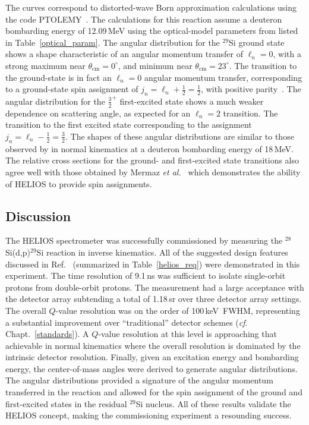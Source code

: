 The curves correspond to distorted-wave Born approximation calculations using the code PTOLEMY~\cite{Macfarlane_1978}.  The calculations for this reaction assume a deuteron bombarding energy of 12.09\,MeV using the optical-model parameters from listed in Table~\ref{optical_param}.  The angular distribution for the $^{29}$Si ground state shows a
shape characteristic of an angular momentum transfer of $\ell_n=0$, with
a strong maximum near $\theta_\mathrm{cm}=0^\circ$, and minimum near
$\theta_\mathrm{cm}=23^\circ$.  The transition to the ground-state is in fact an $\ell_n=0$ angular momentum transfer, corresponding to a ground-state spin assignment of $j_n=\ell_n+\frac{1}{2}=\frac{1}{2}$, with positive parity~\cite{Kuehner_1960}.  The angular distribution for the
$\frac{3}{2}^+$ first-excited state shows a much weaker dependence on
scattering angle, as expected for an $\ell_n=2$ transition.  The transition to the first excited state %
corresponding to the assignment $j_n=\ell_n-\frac{1}{2}=\frac{3}{2}$. %
The shapes
of these angular distributions are similar to those observed by \citet{Mermaz_1971} in normal kinematics at a deuteron
bombarding energy of 18\,MeV.  The relative cross sections for the
ground- and first-excited state transitions also agree well with those
obtained by Mermaz \textit{et al.\ } which demonstrates the ability of HELIOS to provide spin assignments.

\subsection{Discussion}
\label{sidisc}
The HELIOS spectrometer was successfully commissioned by measuring the $^{28}$Si(d,p)$^{29}$Si reaction in inverse kinematics.  All of the suggested design features discussed in Ref.~\cite{Wuosmaa_2007} (summarized in Table~\ref{helios_req}) were demonstrated in this experiment.  The time resolution of 9.1\,ns was sufficient to isolate single-orbit protons from double-orbit protons.  The measurement had a large acceptance with the detector array subtending a total of 1.18\,sr over three detector array settings.  The overall $Q$-value resolution was on the order of 100\,keV~FWHM, representing a substantial improvement over ``traditional'' detector schemes (\textit{cf}. Chapt.~\ref{standards}).  A $Q$-value resolution at this level is approaching that achievable in normal kinematics where the overall resolution is dominated by the intrinsic detector resolution.  Finally, given an excitation energy and bombarding energy, the center-of-mass angles were derived to generate angular distributions.  The angular distributions provided a signature of the angular momentum transferred in the reaction and allowed for the spin assignment of the ground and first-excited states in the residual $^{29}$Si nucleus.  All of these results validate the HELIOS concept, making the commissioning experiment a resounding success.

